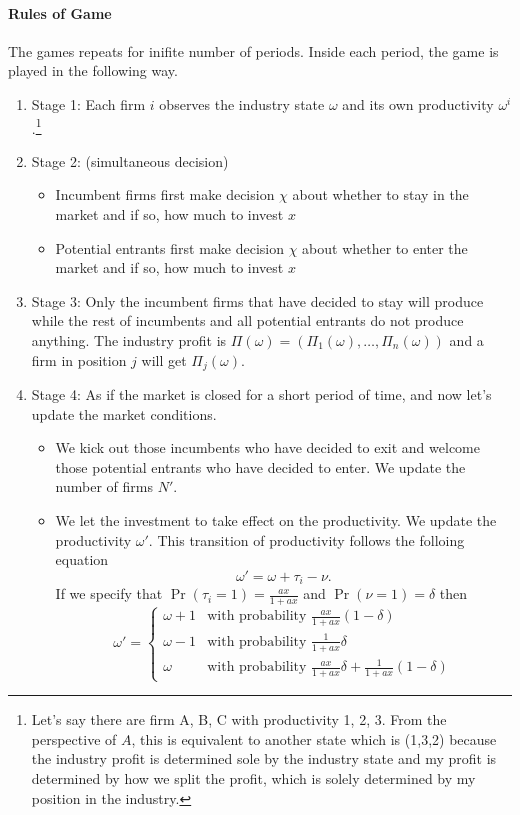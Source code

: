 \documentclass[12pt]{article}[margin=1in]
\begin{document}
\paragraph{Rules of Game} The games repeats for inifite number of periods. Inside each period, the game is played in the following way.
\begin{enumerate}
    \item Stage 1: Each firm $i$ observes the industry state $\omega$ and its own productivity $\omega^i$.\footnote{Let's say there are firm A, B, C with productivity 1, 2, 3. From the perspective of $A$, this is equivalent to another state which is (1,3,2) because the industry profit is determined sole by the industry state and my profit is determined by how we split the profit, which is solely determined by my position in the industry.}
    \item Stage 2: (simultaneous decision)
    \begin{itemize}
        \item Incumbent firms first make decision $\chi$ about whether to stay in the market and if so, how much to invest $x$
        \item Potential entrants first make decision $\chi$ about whether to enter the market and if so, how much to invest $x$
    \end{itemize}
    \item Stage 3: Only the incumbent firms that have decided to stay will produce while the rest of incumbents and all potential entrants do not produce anything. The industry profit is $\Pi(\omega)=(\Pi_1(\omega),\ldots,\Pi_n(\omega))$ and a firm in position $j$ will get $\Pi_j(\omega)$.
    \item Stage 4: As if the market is closed for a short period of time, and now let's update the market conditions.
    \begin{itemize}
        \item We kick out those incumbents who have decided to exit and welcome those potential entrants who have decided to enter. We update the number of firms $N'$. 
        \item We let the investment to take effect on the productivity. We update the productivity $\omega'$. This transition of productivity follows the folloing equation $$\omega'=\omega+\tau_i-\nu.$$ If we specify that $\Pr(\tau_i=1)=\frac{ax}{1+ax}$ and $\Pr(\nu=1)=\delta$ then 
        \begin{equation*}
            \omega'=\begin{cases}
                \omega+1 & \text{with probability } \frac{ax}{1+ax}(1-\delta) \\
                \omega-1 & \text{with probability } \frac{1}{1+ax}\delta\\
                \omega & \text{with probability } \frac{ax}{1+ax}\delta+\frac{1}{1+ax}(1-\delta)
            \end{cases}
        \end{equation*}
    \end{itemize}
\end{enumerate}
\end{document}
